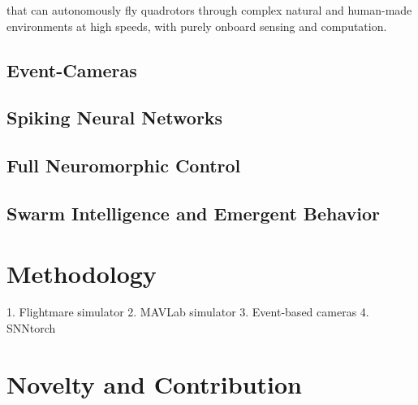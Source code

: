 \documentclass{article}
\begin{document}
that can autonomously fly quadrotors through complex natural and human-made environments at high speeds, with purely onboard sensing and computation.
\subsection{Event-Cameras}
\subsection{Spiking Neural Networks}
\subsection{Full Neuromorphic Control}
\subsection{Swarm Intelligence and Emergent Behavior}


\section{Methodology}

1. Flightmare simulator
2. MAVLab simulator
3. Event-based cameras
4. SNNtorch


\section{Novelty and Contribution}

\printbibliography[title={\section{References}}]
\end{document}
